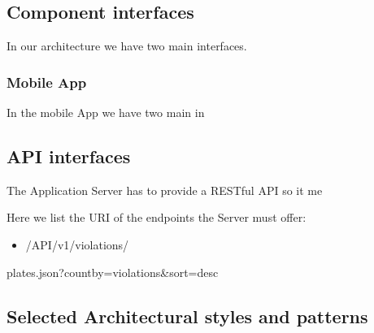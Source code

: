 \subsection{Component interfaces}
In our architecture we have two main interfaces.


\subsubsection{Mobile App}
In the mobile App we have two main in



\subsection{API interfaces}
The Application Server has to provide a RESTful API so it me

Here we list the URI of the endpoints the Server must offer:
\begin{itemize}
  \item /API/v1/violations/
\end{itemize}

plates.json?countby=violations&sort=desc





\subsection{Selected Architectural styles and patterns}
 \label{cleanArchiref}

